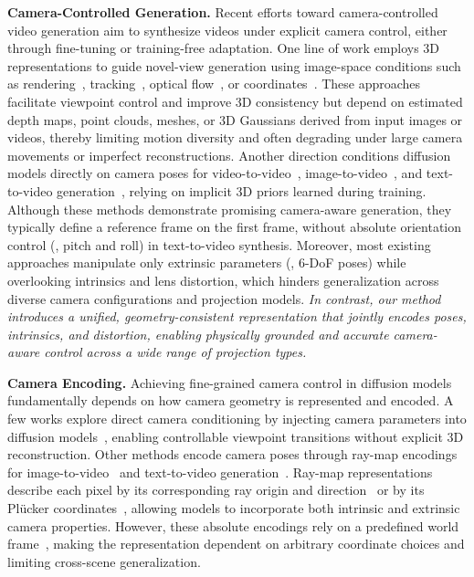 \noindent\textbf{Camera-Controlled Generation.}
Recent efforts toward camera-controlled video generation aim to synthesize videos under explicit camera control, either through fine-tuning or training-free adaptation.
One line of work employs 3D representations to guide novel-view generation using image-space conditions such as rendering~\cite{yu2024viewcrafter,ma2025you,cao2025uni3c,zhang2025i2v3d,mengnvs,li2025realcam,zhai2025stargen,yu2025trajectorycrafter,i2vcontrolcamera}, tracking~\cite{gu2025diffusion}, optical flow~\cite{jin2025flovd,burgert2025go}, or coordinates~\cite{zhang2025world}.
These approaches facilitate viewpoint control and improve 3D consistency but depend on estimated depth maps, point clouds, meshes, or 3D Gaussians derived from input images or videos, thereby limiting motion diversity and often degrading under large camera movements or imperfect reconstructions.
Another direction conditions diffusion models directly on camera poses for video-to-video~\cite{bai2025recammaster}, image-to-video~\cite{liang2025wonderland,gao2024cat3d,zheng2024cami2v,zhou2025stable,he2025cameractrl}, and text-to-video generation~\cite{bahmani2025ac3d,he2024cameractrl,bahmanivd3d,wang2024motionctrl,cheong2024boosting}, relying on implicit 3D priors learned during training.
Although these methods demonstrate promising camera-aware generation, they typically define a reference frame on the first frame, without absolute orientation control (\eg, pitch and roll) in text-to-video synthesis.
Moreover, most existing approaches manipulate only extrinsic parameters (\ie, 6-DoF poses) while overlooking intrinsics and lens distortion, which hinders generalization across diverse camera configurations and projection models.
\textit{In contrast, our method introduces a unified, geometry-consistent representation that jointly encodes poses, intrinsics, and distortion, enabling physically grounded and accurate camera-aware control across a wide range of projection types.}

\noindent\textbf{Camera Encoding.}
Achieving fine-grained camera control in diffusion models fundamentally depends on how camera geometry is represented and encoded.
A few works explore direct camera conditioning by injecting camera parameters into diffusion models~\cite{wang2024motionctrl,bai2025recammaster}, enabling controllable viewpoint transitions without explicit 3D reconstruction.
Other methods encode camera poses through ray-map encodings for image-to-video~\cite{liang2025wonderland,gao2024cat3d,zheng2024cami2v,zhou2025stable,he2025cameractrl} and text-to-video generation~\cite{bahmani2025ac3d,he2024cameractrl,bahmanivd3d}.
Ray-map representations describe each pixel by its corresponding ray origin and direction~\cite{mildenhall2021nerf,gao2024cat3d} or by its Pl\"ucker coordinates~\cite{plucker1865xvii,bahmani2025ac3d,wang2025akira}, allowing models to incorporate both intrinsic and extrinsic camera properties.
However, these absolute encodings rely on a predefined world frame~\cite{mildenhall2019local,gao2024cat3d,guizilini2025zero}, making the representation dependent on arbitrary coordinate choices and limiting cross-scene generalization.

